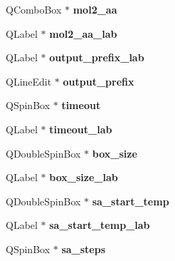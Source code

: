\begin{DoxyCompactItemize}
\item 
\hypertarget{classMCWidget_a6a9162efda732a88f0ef9e7b8a55da62}{
QComboBox $\ast$ {\bfseries mol2\_\-aa}}
\label{classMCWidget_a6a9162efda732a88f0ef9e7b8a55da62}

\item 
\hypertarget{classMCWidget_a0859e83beabae21261029ff9f354922c}{
QLabel $\ast$ {\bfseries mol2\_\-aa\_\-lab}}
\label{classMCWidget_a0859e83beabae21261029ff9f354922c}

\item 
\hypertarget{classMCWidget_aaeedc7dc9a9c9e07eee9af130afb91d3}{
QLabel $\ast$ {\bfseries output\_\-prefix\_\-lab}}
\label{classMCWidget_aaeedc7dc9a9c9e07eee9af130afb91d3}

\item 
\hypertarget{classMCWidget_a09a7b4a56796e0387db4bb2cc7ce7045}{
QLineEdit $\ast$ {\bfseries output\_\-prefix}}
\label{classMCWidget_a09a7b4a56796e0387db4bb2cc7ce7045}

\item 
\hypertarget{classMCWidget_ac3afd783a82d2ea22e6f002f742acb43}{
QSpinBox $\ast$ {\bfseries timeout}}
\label{classMCWidget_ac3afd783a82d2ea22e6f002f742acb43}

\item 
\hypertarget{classMCWidget_a90c4c1be25ead06e4b33c8255a2c4abc}{
QLabel $\ast$ {\bfseries timeout\_\-lab}}
\label{classMCWidget_a90c4c1be25ead06e4b33c8255a2c4abc}

\item 
\hypertarget{classMCWidget_a4f466db5d317533827c18ae8815699a3}{
QDoubleSpinBox $\ast$ {\bfseries box\_\-size}}
\label{classMCWidget_a4f466db5d317533827c18ae8815699a3}

\item 
\hypertarget{classMCWidget_a25534438558b6c258b5e820177eaed1a}{
QLabel $\ast$ {\bfseries box\_\-size\_\-lab}}
\label{classMCWidget_a25534438558b6c258b5e820177eaed1a}

\item 
\hypertarget{classMCWidget_a703b9b4cec0df005d6c8ad90c8f99ae5}{
QDoubleSpinBox $\ast$ {\bfseries sa\_\-start\_\-temp}}
\label{classMCWidget_a703b9b4cec0df005d6c8ad90c8f99ae5}

\item 
\hypertarget{classMCWidget_a188a31b0392934a6f2cc6a6cc72fe555}{
QLabel $\ast$ {\bfseries sa\_\-start\_\-temp\_\-lab}}
\label{classMCWidget_a188a31b0392934a6f2cc6a6cc72fe555}

\item 
\hypertarget{classMCWidget_a5529253fea9cff2f7a7b754532197524}{
QSpinBox $\ast$ {\bfseries sa\_\-steps}}
\label{classMCWidget_a5529253fea9cff2f7a7b754532197524}


\end{DoxyCompactItemize}
